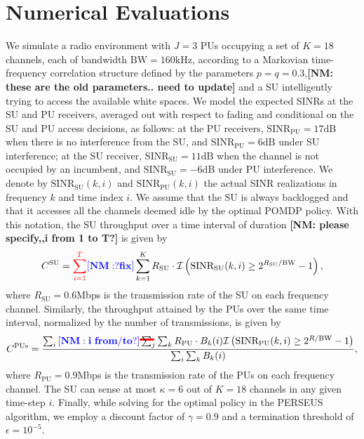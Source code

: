 \documentclass[10pt,twocolumn]{IEEEtran}
\newcommand{\nm}[1]{{\color{blue}\bf{[NM: #1]}}}
\newcommand\mst[2][red]{\setbox0=\hbox{$#2$}\rlap{\raisebox{.45\ht0}{\textcolor{#1}{\rule{\wd0}{2pt}}}}#2}
\newcommand{\add}[1]{{\color{red}{#1}}}
\begin{document}
\section{Numerical Evaluations}\label{IV}
We simulate a radio environment with $J{=}3$ PUs occupying a set of $K{=}18$ channels, each of bandwidth $\text{BW}{=}160 \text{kHz}$, according to a Markovian time-frequency correlation structure defined by the parameters $p{=}q{=}0.3$,\nm{these are the old parameters.. need to update} and a SU intelligently trying to access the available white spaces. We model the expected SINRs at the SU and PU receivers, averaged out with respect to fading and conditional on the SU and PU access decisions, as follows: 
at the PU receivers,
$\text{SINR}_{\text{PU}}{=}17\text{dB}$ when there is no interference from the SU, and $\text{SINR}_{\text{PU}}{=}6\text{dB}$ under SU interference; 
at the SU receiver,
 $\text{SINR}_{\text{SU}}{=}11\text{dB}$ when the channel is not occupied by an incumbent, and $\text{SINR}_{\text{SU}}{=}{-}6\text{dB}$ under PU interference.
  We denote by $\text{SINR}_{\text{SU}}(k,i)$ 
 and $\text{SINR}_{\text{PU}}(k,i)$ 
 the actual SINR realizations in 
 frequency $k$ and time index $i$.
  We assume that the SU is always backlogged and that it accesses all the channels deemed idle by the optimal POMDP policy. 
 With this notation, the SU throughput
 over a time interval of duration \nm{please specify,,i from 1 to T?}
  is given by $$C^{\text{SU}} = \add{\sum_{i=1}^T}\nm{? fix}\sum_{k=1}^{K} R_{\text{SU}} \cdot \mathcal{I}\left(\text{SINR}_{\text{SU}}(k,i) \geq 2^{R_{\text{SU}}/\text{BW}} - 1\right),$$ where $R_{\text{SU}}{=}0.6$Mbps is the transmission rate
   of the SU on each frequency channel. Similarly, the throughput attained by the PUs
  over the same time interval,
  normalized by the number of transmissions,
   is given by $$C^{\text{PUs}} = \frac{\sum_{i}\nm{i\ from/to?}\mst{\sum_{j}}\sum_{k}R_{\text{PU}} \cdot B_{k}(i)\mathcal{I}\left(\text{SINR}_{\text{PU}}(k,i) \geq 2^{R/\text{BW}} - 1\right)}{\sum_{i}\sum_{k}B_{k}(i)},$$ where $R_{\text{PU}}{=}0.9$Mbps is the transmission rate of the PUs on each frequency channel. The SU can sense at most $\kappa{=}6$ out of $K{=}18$ channels in any given time-step $i$. Finally, while solving for the optimal policy in the PERSEUS algorithm, we employ a discount factor of $\gamma{=}0.9$ and a termination threshold of $\epsilon{=}10^{-5}$.
\end{document}
